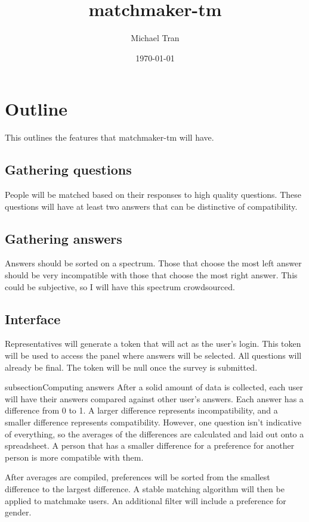 \documentclass[12pt]{article}
\title{matchmaker-tm}
\author{Michael Tran}
\date{\today}
\begin{document}
\maketitle

\section{Outline}
This outlines the features that matchmaker-tm will have.

\subsection{Gathering questions}
People will be matched based on their responses to high quality questions. These
questions will have at least two answers that can be distinctive of
compatibility.

\subsection{Gathering answers}
Answers should be sorted on a spectrum. Those that choose the most left answer
should be very incompatible with those that choose the most right answer. This
could be subjective, so I will have this spectrum crowdsourced.

\subsection{Interface}
Representatives will generate a token that will act as the user's login. This
token will be used to access the panel where answers will be selected. All
questions will already be final. The token will be null once the survey is
submitted.

subsection{Computing answers}
After a solid amount of data is collected, each user will have their answers
compared against other user's answers. Each answer has a difference from 0 to 1.
A larger difference represents incompatibility, and a smaller difference
represents compatibility. However, one question isn't indicative of everything,
so the averages of the differences are calculated and laid out onto a
spreadsheet. A person that has a smaller difference for a preference for another 
person is more compatible with them.

After averages are compiled, preferences will be sorted from the smallest
difference to the largest difference. A stable matching algorithm will then be
applied to matchmake users. An additional filter will include a preference for
gender.
\end{document}
